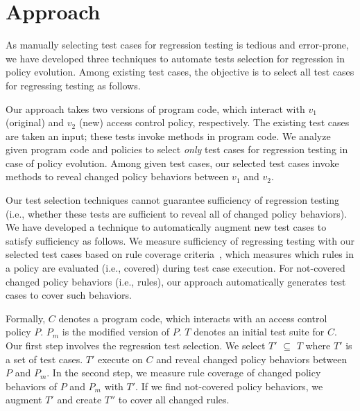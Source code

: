 \section{Approach}
\label{sec:approach}
As manually selecting test cases for regression testing is tedious and error-prone, we have developed three techniques to automate 
tests selection for regression in policy evolution. Among existing test cases, the objective is to select 
all test cases for regressing testing as follows.

Our approach takes two versions of program code, which interact with $v_1$ (original) and $v_2$ (new) access control policy, 
respectively. The existing test cases are taken an input; these tests invoke methods in program code.
We analyze given program code and policies to select \emph{only} test cases for regression testing in case of policy evolution. 
Among given test cases, our selected test cases invoke methods to reveal changed policy behaviors between $v_1$ and $v_2$.

Our test selection techniques cannot guarantee sufficiency of regression 
testing (i.e., whether these tests are sufficient to reveal all of changed policy behaviors). We have developed a technique to 
automatically augment new test cases to satisfy sufficiency as follows. We measure sufficiency of regressing testing with our 
selected test cases based on rule coverage criteria~\cite{martin06:defining}, which measures which rules in a policy are evaluated (i.e., covered) during test case execution. For not-covered changed policy behaviors (i.e., rules), 
our approach automatically generates test cases to cover such behaviors.

Formally, $C$ denotes a program code, which interacts with an access control policy $P$. $P_{m}$ is the modified version of $P$. 
$T$ denotes an initial test suite for $C$. Our first step involves the regression test 
selection. We select $T'$ $\subseteq$ $T$ where $T'$ is a set of test cases. $T'$ execute on $C$ and reveal changed policy 
behaviors between $P$ and $P_{m}$. In the second step, we measure rule coverage of changed policy behaviors of $P$ and $P_{m}$ with $T'$. 
If we find not-covered policy behaviors, we augment $T'$ and create $T''$ to cover all changed rules. 


